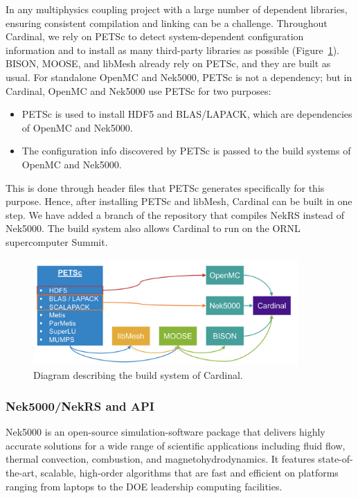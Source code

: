 In any multiphysics coupling project with a large number of dependent libraries, ensuring consistent compilation and linking can be a challenge. Throughout Cardinal, we rely on PETSc to detect system-dependent configuration information and to install as many third-party libraries as possible (Figure~\ref{f:build}). BISON, MOOSE, and libMesh already rely on PETSc, and they are built as usual. For standalone OpenMC and
Nek5000, PETSc is not a dependency; but in Cardinal, OpenMC and Nek5000 use PETSc for two purposes:
\begin{itemize}
\item PETSc is used to install HDF5 and BLAS/LAPACK, which are dependencies of OpenMC and Nek5000.
\item The configuration info discovered by PETSc is passed to the build systems of OpenMC and Nek5000.
\end{itemize}
This is done through header files that PETSc generates specifically for this purpose. Hence, after installing PETSc and libMesh, Cardinal can be built in one step.
We have added a branch of the repository that compiles NekRS instead of Nek5000. The build system also allows Cardinal to run on the ORNL supercomputer Summit.
\begin{figure}[!h]
\centering
\includegraphics[clip=true,width=0.9\textwidth]{Figures/build}
\caption{Diagram describing the build system of Cardinal.}
\label{f:build}
\end{figure}

\subsubsection{Nek5000/NekRS and API}

Nek5000 \cite{fischer2015nek5000} is an open-source simulation-software package that delivers highly accurate solutions for a wide range of scientific applications including
fluid flow, thermal convection, combustion, and magnetohydrodynamics. It features state-of-the-art, scalable, high-order algorithms that are fast and efficient on platforms ranging from laptops to the DOE leadership computing facilities.


